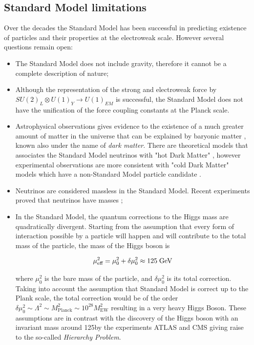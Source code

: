 \subsection{Standard Model limitations}

Over the decades the Standard Model has been successful in predicting existence of particles and their properties at the electroweak scale. However several questions remain open:

\begin{itemize}
	\item The Standard Model does not include gravity, therefore it cannot be a complete description of nature;
	\item Although the representation of the strong and electroweak force by $SU(2)_L\otimes U(1)_Y \to U(1)_{EM}$ is successful, the Standard Model does not have the unification of the force coupling constants at the Planck scale.
	\item Astrophysical observations gives evidence to the existence of a much greater amount of matter in the universe that can be explained by baryonic matter \cite{deBoer:2005tm}, known also under the name of \textit{dark matter}. There are theoretical models that associates the Standard Model neutrinos with "hot Dark Matter" \cite{Klypin:1992sf}, however experimental observations are more consistent with  "cold Dark Matter" models which have a non-Standard Model particle candidate \cite{Jungman:1995df}.
	\item Neutrinos are considered massless in the Standard Model. Recent experiments proved that neutrinos have masses \cite{Fukuda:1998mi};
	\item In the Standard Model, the quantum corrections to the Higgs mass are quadratically divergent. Starting from the assumption that every form of interaction possible by a particle will happen and will contribute to the total mass of the particle, the mass of the Higgs boson is 
	
	\begin{equation}
	\mu^{2}_{\text{eff}} = \mu^{2}_{0} + \delta\mu^{2}_{0} \approx 125\;\text{Ge}\kern-0.06667em\text{V}
	\end{equation}
	
	where $\mu^{2}_{0}$ is the bare mass of the particle, and $\delta\mu^{2}_{0} $ is its total correction. Taking into account the assumption that Standard Model is correct up to the Plank scale, the total correction would be of the order  $\delta\mu^{2}_{0}  \sim \Lambda^{2} \sim M^{2}_{\text{Planck}} \sim 10^{28}M^{2}_{\text{EW}}$ resulting in a very heavy Higgs Boson. These assumptions are in contrast with the discovery of the Higgs boson with an invariant mass around 125\gev by the experiments ATLAS \cite{Aad:2012tfa} and CMS \cite{Chatrchyan:2012xdj} giving raise to the so-called \textit{Hierarchy Problem}.
	
\end{itemize}

